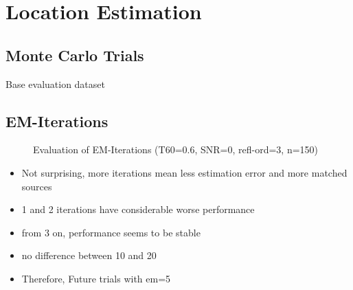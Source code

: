 \section{Location Estimation}
\subsection{Monte Carlo Trials}

%		
%
\begin{table}[H]
	\centering
	
	\caption{Base evaluation dataset}
\end{table}

\setcounter{topnumber}{2}
\setcounter{bottomnumber}{2}
\setcounter{totalnumber}{4}
\renewcommand{\topfraction}{0.85}
\renewcommand{\bottomfraction}{0.85}
\renewcommand{\textfraction}{0.15}
\renewcommand{\floatpagefraction}{0.8}
\renewcommand{\textfraction}{0.1}
\setlength{\floatsep}{5pt plus 2pt minus 2pt}
\setlength{\textfloatsep}{5pt plus 2pt minus 2pt}
\setlength{\intextsep}{5pt plus 2pt minus 2pt}

\subsection*{EM-Iterations}
\begin{figure}[!htp]
    \centering
    \begin{subfigure}{0.49\textwidth}
          \centering
	       
%            
	\end{subfigure}
    \begin{subfigure}{0.49\textwidth}
          \centering
	       
%            
	\end{subfigure}
\caption{Evaluation of EM-Iterations (T60=0.6, SNR=0, refl-ord=3, n=150)}
\end{figure}

\begin{itemize}
\item Not surprising, more iterations mean less estimation error and more matched sources
\item 1 and 2 iterations have considerable worse performance
\item from 3 on, performance seems to be stable
\item no difference between 10 and 20
\item Therefore, Future trials with em=5
\end{itemize}

